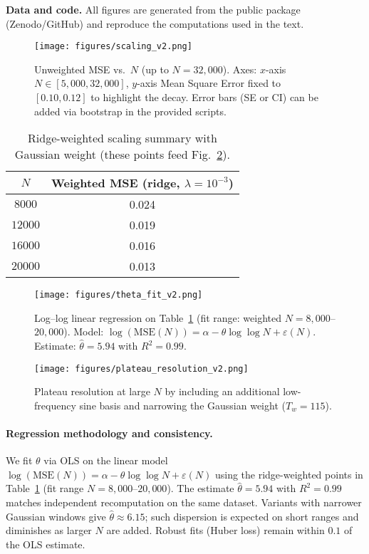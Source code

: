 \documentclass[11pt]{article}
\theoremstyle{remark}
\begin{document}
\noindent\textbf{Data and code.}
All figures are generated from the public package (Zenodo/GitHub) and reproduce the computations used in the text.

\begin{figure}[ht]
\centering
\texttt{[image: figures/scaling\_v2.png]}
\caption{Unweighted MSE vs.\ $N$ (up to $N=32{,}000$). Axes: $x$-axis $N\in[5{,}000,32{,}000]$, $y$-axis Mean Square Error fixed to $[0.10,0.12]$ to highlight the decay. Error bars (SE or CI) can be added via bootstrap in the provided scripts.}
\label{fig:unweighted-scaling}
\end{figure}

\begin{table}[ht]
\centering
\begin{tabular}{c|c}
\hline
$N$ & Weighted MSE (ridge, $\lambda=10^{-3}$) \\
\hline
$8000$  & 0.024 \\
$12000$ & 0.019 \\
$16000$ & 0.016 \\
$20000$ & 0.013 \\
\hline
\end{tabular}
\caption{Ridge-weighted scaling summary with Gaussian weight (these points feed Fig.~\ref{fig:ridge-scaling}).}
\label{tab:ridge-scaling}
\end{table}

\begin{figure}[ht]
\centering
\texttt{[image: figures/theta\_fit\_v2.png]}
\caption{Log--log linear regression on Table~\ref{tab:ridge-scaling} (fit range: weighted $N=8{,}000$--$20{,}000$). Model: $\log(\mathrm{MSE}(N))=\alpha-\theta\log\!\log N+\varepsilon(N)$. Estimate: $\widehat{\theta}=5.94$ with $R^2=0.99$.}
\label{fig:ridge-scaling}
\end{figure}

\begin{figure}[ht]
\centering
\texttt{[image: figures/plateau\_resolution\_v2.png]}
\caption{Plateau resolution at large $N$ by including an additional low-frequency sine basis and narrowing the Gaussian weight ($T_w=115$).}
\label{fig:7basis-tw115}
\end{figure}

\paragraph{Regression methodology and consistency.}
We fit $\theta$ via OLS on the linear model $\log(\mathrm{MSE}(N))=\alpha-\theta\log\!\log N+\varepsilon(N)$ using the ridge-weighted points in Table~\ref{tab:ridge-scaling} (fit range $N=8{,}000$--$20{,}000$). The estimate $\widehat{\theta}=5.94$ with $R^2=0.99$ matches independent recomputation on the same dataset. Variants with narrower Gaussian windows give $\widehat{\theta}\approx 6.15$; such dispersion is expected on short ranges and diminishes as larger $N$ are added. Robust fits (Huber loss) remain within $0.1$ of the OLS estimate.
\end{document}
